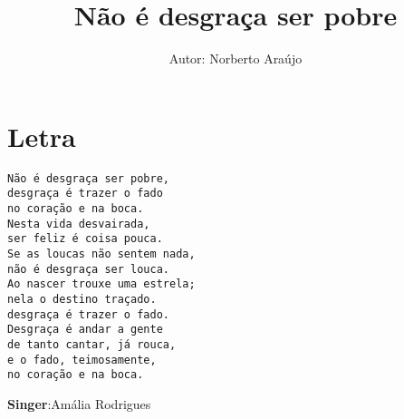 \documentclass[12pt,a4paper]{article}
\begin{document}
\title{Não é desgraça ser pobre}
\author{Autor: Norberto Araújo\\}
\date{}
\maketitle
\section*{Letra}
\begin{verbatim}Não é desgraça ser pobre,
desgraça é trazer o fado
no coração e na boca.
Nesta vida desvairada,
ser feliz é coisa pouca.
Se as loucas não sentem nada,
não é desgraça ser louca.
Ao nascer trouxe uma estrela;
nela o destino traçado.
desgraça é trazer o fado.
Desgraça é andar a gente
de tanto cantar, já rouca,
e o fado, teimosamente,
no coração e na boca.
\end{verbatim}\begin{flushright}
\textbf{Singer}:Amália Rodrigues
\end{flushright}
\end{document}
